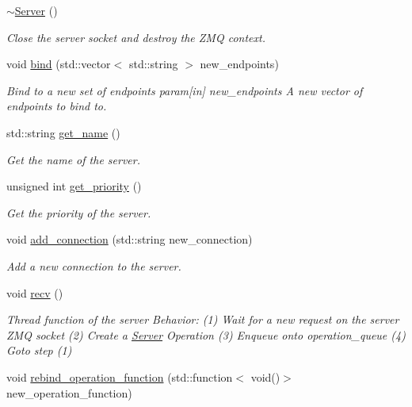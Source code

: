 \begin{DoxyCompactItemize}
\hyperlink{classzcm_1_1Server_a1aac28d71da6d5e66fff629d7206b3c6}{$\sim$\-Server} ()
\begin{DoxyCompactList}\small\item\em Close the server socket and destroy the Z\-M\-Q context. \end{DoxyCompactList}\item 
void \hyperlink{classzcm_1_1Server_a663b9c844bd17d3174cdfe367fe7d2e2}{bind} (std\-::vector$<$ std\-::string $>$ new\-\_\-endpoints)
\begin{DoxyCompactList}\small\item\em Bind to a new set of endpoints param\mbox{[}in\mbox{]} new\-\_\-endpoints A new vector of endpoints to bind to. \end{DoxyCompactList}\item 
std\-::string \hyperlink{classzcm_1_1Server_adff186f44785ea8c17f3d96cf8e254e6}{get\-\_\-name} ()
\begin{DoxyCompactList}\small\item\em Get the name of the server. \end{DoxyCompactList}\item 
unsigned int \hyperlink{classzcm_1_1Server_ae570e2fe8f61761951d79c9c5b6ea988}{get\-\_\-priority} ()
\begin{DoxyCompactList}\small\item\em Get the priority of the server. \end{DoxyCompactList}\item 
void \hyperlink{classzcm_1_1Server_ad1c5e86ea9384c95774046ac469092b7}{add\-\_\-connection} (std\-::string new\-\_\-connection)
\begin{DoxyCompactList}\small\item\em Add a new connection to the server. \end{DoxyCompactList}\item 
void \hyperlink{classzcm_1_1Server_ae30eb0c0b4cfad74b7f73c17815511eb}{recv} ()
\begin{DoxyCompactList}\small\item\em Thread function of the server Behavior\-: (1) Wait for a new request on the server Z\-M\-Q socket (2) Create a \hyperlink{classzcm_1_1Server}{Server} Operation (3) Enqueue onto operation\-\_\-queue (4) Goto step (1) \end{DoxyCompactList}\item 
void \hyperlink{classzcm_1_1Server_adea8c2eb84e811e8f743ece882b5813a}{rebind\-\_\-operation\-\_\-function} (std\-::function$<$ void()$>$ new\-\_\-operation\-\_\-function)

\end{DoxyCompactItemize}
